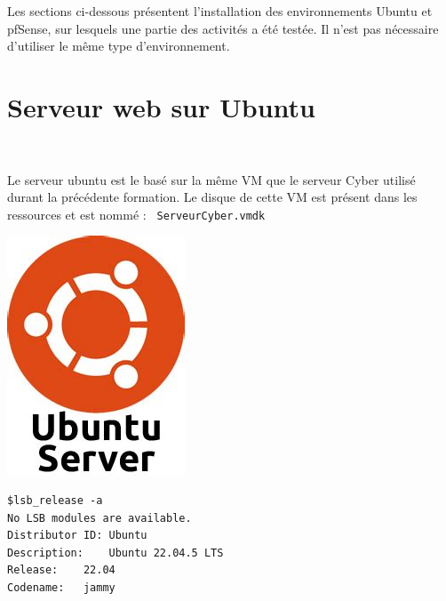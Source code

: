 \documentclass[french, 12pt]{article}%
\begin{document}
Les sections ci-dessous présentent l’installation des environnements Ubuntu et pfSense, sur lesquels une partie des activités a été testée. Il n'est pas nécessaire d'utiliser le même type d'environnement. 



\section{Serveur web sur Ubuntu}

\
\begin{minipage}{0.6\linewidth}
Le serveur ubuntu est le basé sur la même VM que le serveur Cyber utilisé durant la précédente formation. Le disque de cette VM est présent dans les ressources et est nommé : \verb? ServeurCyber.vmdk? 

\end{minipage}
\begin{minipage}{0.39\linewidth}
\begin{center}
\includegraphics[scale=0.3]{./ressource/serveurUbuntu.jpeg}
\end{center}
\end{minipage}


\vspace{0.5cm}
\begin{lstlisting}[style=commande]
$lsb_release -a
No LSB modules are available.
Distributor ID:	Ubuntu
Description:	Ubuntu 22.04.5 LTS
Release:	22.04
Codename:	jammy
\end{lstlisting}
\end{document}
